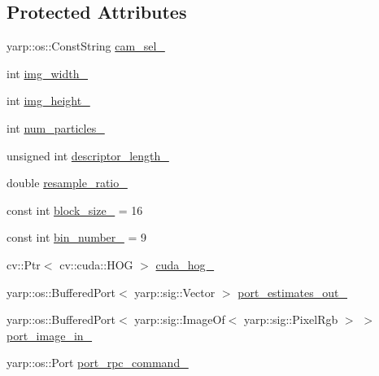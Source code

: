 \subsection*{Protected Attributes}
\begin{DoxyCompactItemize}
\item 
yarp\+::os\+::\+Const\+String \hyperlink{classVisualSIS_a4ba71c5fa28e12504eea098298a28f66}{cam\+\_\+sel\+\_\+}
\item 
int \hyperlink{classVisualSIS_a1e168675500d9c8a949e8c2f69be1f5f}{img\+\_\+width\+\_\+}
\item 
int \hyperlink{classVisualSIS_aff43a51053f61e07a9803926111b9cc6}{img\+\_\+height\+\_\+}
\item 
int \hyperlink{classVisualSIS_af79e137085ec9c4764f5d7f8f0630cb5}{num\+\_\+particles\+\_\+}
\item 
unsigned int \hyperlink{classVisualSIS_a030a089e79e98f530082889b6d1d7090}{descriptor\+\_\+length\+\_\+}
\item 
double \hyperlink{classVisualSIS_a5e400fe8722793a0cc3a64900b30ff6a}{resample\+\_\+ratio\+\_\+}
\item 
const int \hyperlink{classVisualSIS_ae05ef520a7385930b44409f0ff83e99e}{block\+\_\+size\+\_\+} = 16
\item 
const int \hyperlink{classVisualSIS_a454d2a632bd8db7379882d61a85414bc}{bin\+\_\+number\+\_\+} = 9
\item 
cv\+::\+Ptr$<$ cv\+::cuda\+::\+H\+OG $>$ \hyperlink{classVisualSIS_aebdc06fc72c1e391c69bdcbd19fde848}{cuda\+\_\+hog\+\_\+}
\item 
yarp\+::os\+::\+Buffered\+Port$<$ yarp\+::sig\+::\+Vector $>$ \hyperlink{classVisualSIS_a844c2f19eef592ce79a3e56ee845b1bb}{port\+\_\+estimates\+\_\+out\+\_\+}
\item 
yarp\+::os\+::\+Buffered\+Port$<$ yarp\+::sig\+::\+Image\+Of$<$ yarp\+::sig\+::\+Pixel\+Rgb $>$ $>$ \hyperlink{classVisualSIS_ac45684c34e7413a13b6ed301cd8a7aa1}{port\+\_\+image\+\_\+in\+\_\+}
\item 
yarp\+::os\+::\+Port \hyperlink{classVisualSIS_ac08ca49836aaad57b7d5f7240a6d1ca5}{port\+\_\+rpc\+\_\+command\+\_\+}
\end{DoxyCompactItemize}
